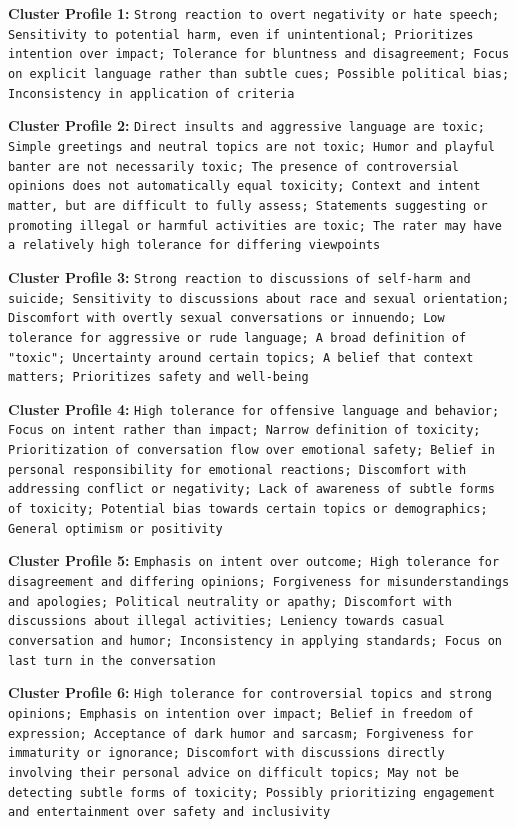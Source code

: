 \documentclass[11pt]{article}
\begin{document}
\textbf{Cluster Profile 1:} \texttt{Strong reaction to overt negativity or hate speech; Sensitivity to potential harm, even if unintentional; Prioritizes intention over impact; Tolerance for bluntness and disagreement; Focus on explicit language rather than subtle cues; Possible political bias; Inconsistency in application of criteria}

\textbf{Cluster Profile 2:} \texttt{Direct insults and aggressive language are toxic; Simple greetings and neutral topics are not toxic; Humor and playful banter are not necessarily toxic; The presence of controversial opinions does not automatically equal toxicity; Context and intent matter, but are difficult to fully assess; Statements suggesting or promoting illegal or harmful activities are toxic; The rater may have a relatively high tolerance for differing viewpoints}

\textbf{Cluster Profile 3:} \texttt{Strong reaction to discussions of self-harm and suicide; Sensitivity to discussions about race and sexual orientation; Discomfort with overtly sexual conversations or innuendo; Low tolerance for aggressive or rude language; A broad definition of "toxic"; Uncertainty around certain topics; A belief that context matters; Prioritizes safety and well-being}

\textbf{Cluster Profile 4:} \texttt{High tolerance for offensive language and behavior; Focus on intent rather than impact; Narrow definition of toxicity; Prioritization of conversation flow over emotional safety; Belief in personal responsibility for emotional reactions; Discomfort with addressing conflict or negativity; Lack of awareness of subtle forms of toxicity; Potential bias towards certain topics or demographics; General optimism or positivity}

\textbf{Cluster Profile 5:} \texttt{Emphasis on intent over outcome; High tolerance for disagreement and differing opinions; Forgiveness for misunderstandings and apologies; Political neutrality or apathy; Discomfort with discussions about illegal activities; Leniency towards casual conversation and humor; Inconsistency in applying standards; Focus on last turn in the conversation}

\textbf{Cluster Profile 6:} \texttt{High tolerance for controversial topics and strong opinions; Emphasis on intention over impact; Belief in freedom of expression; Acceptance of dark humor and sarcasm; Forgiveness for immaturity or ignorance; Discomfort with discussions directly involving their personal advice on difficult topics; May not be detecting subtle forms of toxicity; Possibly prioritizing engagement and entertainment over safety and inclusivity}
\end{document}
